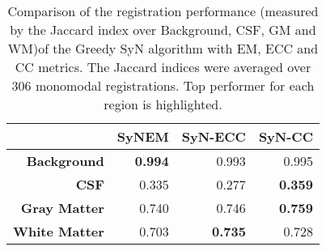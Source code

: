 \begin{table}[htbp]
  \centering
  {\small
    \begin{tabular}{rrrr}
    \toprule
    \textbf{} & \textbf{SyNEM} & \textbf{SyN-ECC} & \textbf{SyN-CC} \\
    \midrule
    \textbf{Background} & \textbf{0.994} & 0.993 & 0.995 \\
    \textbf{CSF} & 0.335 & 0.277 & \textbf{0.359} \\
    \textbf{Gray Matter} & 0.740 & 0.746 & \textbf{0.759} \\
    \textbf{White Matter} & 0.703 & \textbf{0.735} & 0.728 \\
    \bottomrule
    \end{tabular}%
    \caption{Comparison of the registration performance (measured by the Jaccard index over Background, CSF, GM and WM)of the Greedy SyN algorithm with EM, ECC and CC metrics. The Jaccard
indices were averaged over 306 monomodal registrations. Top performer for each region is highlighted.}
  \label{tab:monomodal_results_segTri_fill}}%
\end{table}%
